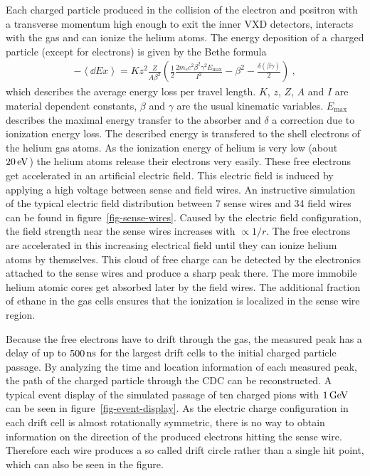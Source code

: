 Each charged particle produced in the collision of the electron and positron with a transverse momentum high enough to exit the inner VXD detectors, interacts with the gas and can ionize the helium atoms. The energy deposition of a charged particle (except for electrons) is given by the Bethe formula~\cite{bethe}
\begin{align}
 - \left\langle \dd{E}{x} \right\rangle = K z^2 \frac{Z}{A \beta^2} \left( \frac 1 2 \frac{2 m_e c^2 \beta^2 \gamma^2 E_\text{max}}{I^2} - \beta^2 - \frac{\delta(\beta \gamma)}{2}  \right) \ , \label{form-bethe}
\end{align}
which describes the average energy loss per travel length. $K$, $z$, $Z$, $A$ and $I$ are material dependent constants, $\beta$ and $\gamma$ are the usual kinematic variables. $E_\text{max}$ describes the maximal energy transfer to the absorber and $\delta$ a correction due to ionization energy loss. The described energy is transfered to the shell electrons of the helium gas atoms. As the ionization energy of helium is very low (about $\unit[20]{eV}$) the helium atoms release their electrons very easily. These free electrons get accelerated in an artificial electric field. This electric field is induced by applying a high voltage between sense and field wires. An instructive simulation of the typical electric field distribution between 7 sense wires and 34 field wires can be found in figure~\ref{fig-sense-wires}. Caused by the electric field configuration, the field strength near the sense wires increases with $\propto 1/r$. The free electrons are accelerated in this increasing  electrical field until they can ionize helium atoms by themselves. This cloud of free charge can be detected by the electronics attached to the sense wires and produce a sharp peak there. The more immobile helium atomic cores get absorbed later by the field wires. The additional fraction of ethane in the gas cells ensures that the ionization is localized in the sense wire region.

Because the free electrons have to drift through the gas, the measured peak has a delay of up to $\unit[500]{ns}$ for the largest drift cells to the initial charged particle passage. By analyzing the time and location information of each measured peak, the path of the charged particle through the CDC can be reconstructed. A typical event display of the simulated passage of ten charged pions with $\unit[1]{GeV}$ can be seen in figure~\ref{fig-event-display}. As the electric charge configuration in each drift cell is almost rotationally symmetric, there is no way to obtain information on the direction of the produced electrons hitting the sense wire. Therefore each wire produces a so called drift circle rather than a single hit point, which can also be seen in the figure.

